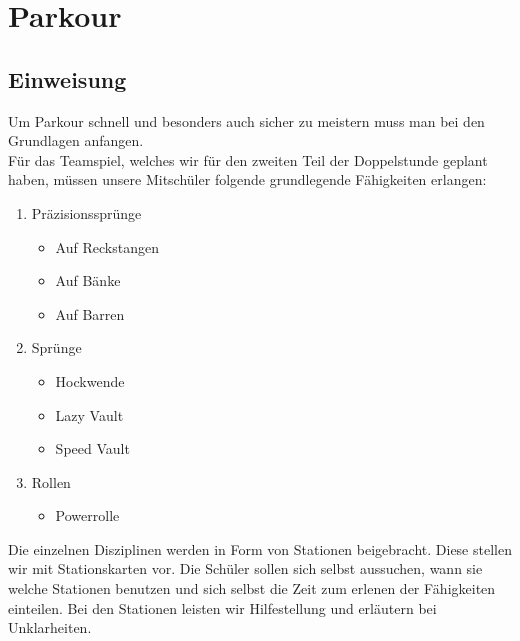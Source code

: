 \documentclass[ngerman,12pt,titlepage]{scrartcl}
\begin{document}
\newpage

\section{Parkour}
\subsection{Einweisung}
Um Parkour schnell und besonders auch sicher zu meistern muss man bei den Grundlagen anfangen. \\ Für das Teamspiel, welches wir für den zweiten Teil der Doppelstunde geplant haben, müssen unsere Mitschüler folgende grundlegende Fähigkeiten erlangen:

\begin{enumerate}
	\item Präzisionssprünge
	\begin{itemize}
		\item Auf Reckstangen
		\item Auf Bänke
		\item Auf Barren
	\end{itemize}
	\item Sprünge
	\begin{itemize}
		\item Hockwende
		\item Lazy Vault
		\item Speed Vault
	\end{itemize}
\item Rollen
	\begin{itemize}
		\item Powerrolle
	\end{itemize}
\end{enumerate}
Die einzelnen Disziplinen werden in Form von Stationen beigebracht. Diese stellen wir mit Stationskarten vor. Die Schüler sollen sich selbst aussuchen, wann sie welche Stationen benutzen und sich selbst die Zeit zum erlenen der Fähigkeiten einteilen. Bei den Stationen leisten wir Hilfestellung und erläutern bei Unklarheiten. \\
\end{document}
